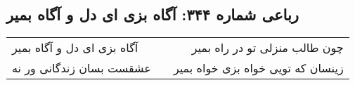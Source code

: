 \begin{center}
\section*{رباعی شماره ۳۴۴: آگاه بزی ای دل و آگاه بمیر}
\label{sec:sh344}
\begin{longtable}{l p{0.5cm} r}
آگاه بزی ای دل و آگاه بمیر
&&
چون طالب منزلی تو در راه بمیر
\\
عشقست بسان زندگانی ور نه
&&
زینسان که تویی خواه بزی خواه بمیر
\\
\end{longtable}
\end{center}
